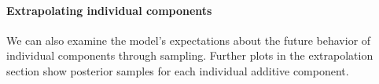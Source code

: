 \documentclass{article} %
\def\ie{i.e.\ }
\def\eg{e.g.\ }
\begin{document}
\paragraph{Extrapolating individual components}
We can also examine the model's expectations about the future behavior of individual components through sampling.  Further plots in the extrapolation section show posterior samples for each individual additive component. %







\end{document}
